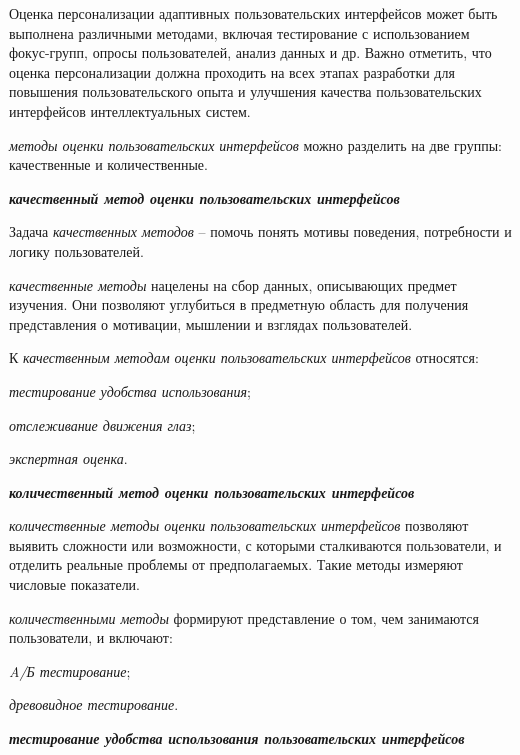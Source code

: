 {\begin{textitemize}
	Оценка персонализации адаптивных пользовательских интерфейсов может быть выполнена различными методами, включая тестирование с использованием фокус-групп, опросы пользователей, анализ данных и др. Важно отметить, что оценка персонализации должна проходить на всех этапах разработки для повышения пользовательского опыта и улучшения качества пользовательских интерфейсов интеллектуальных систем.
\end{textitemize}


\textit{методы оценки пользовательских интерфейсов} можно разделить на две группы: качественные и количественные.

\textbf{\textit{качественный метод оценки пользовательских интерфейсов}}
	
Задача \textit{качественных методов} -- помочь понять мотивы поведения, потребности и логику пользователей.
	
\textit{качественные методы} нацелены на сбор данных, описывающих предмет изучения. Они позволяют углубиться в предметную область для получения представления о мотивации, мышлении и взглядах пользователей. 
	
К \textit{качественным методам оценки пользовательских интерфейсов} относятся:
\begin{textitemize}
	\item \textit{тестирование удобства использования};
	\item \textit{отслеживание движения глаз};
	\item \textit{экспертная оценка}.
\end{textitemize}	
	
\textbf{\textit{количественный метод оценки пользовательских интерфейсов}}

\textit{количественные методы оценки пользовательских интерфейсов} позволяют выявить сложности или возможности, с которыми сталкиваются пользователи, и отделить реальные проблемы от предполагаемых.
Такие методы измеряют числовые показатели. 

\textit{количественными методы} формируют представление о том, чем занимаются пользователи, и включают:
\begin{textitemize}
	\item \textit{A/Б тестирование};
	\item \textit{древовидное тестирование}.
\end{textitemize}	


\textbf{\textit{тестирование удобства использования пользовательских интерфейсов}} 

}
